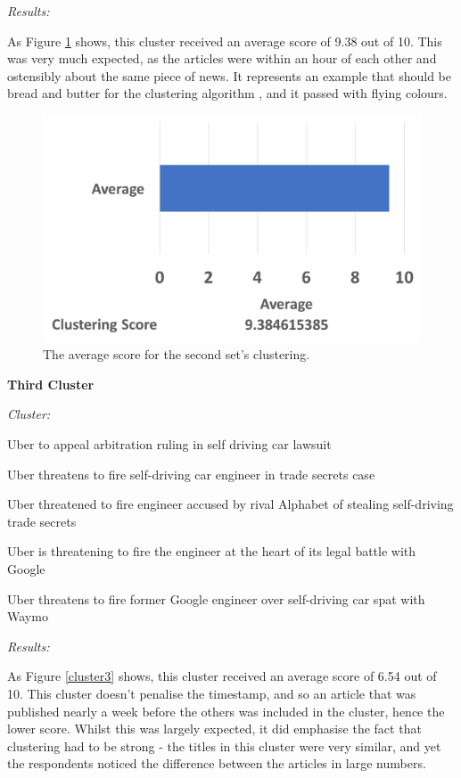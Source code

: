 \documentclass[12pt]{article}
\begin{document}
\emph{Results:}

As Figure \ref{cluster2} shows, this cluster received an average score of 9.38 out of 10. This was very much expected, as the articles were within an hour of each other and ostensibly about the same piece of news. It represents an example that should be bread and butter for the clustering algorithm , and it passed with flying colours. \\

\begin{figure}[ht!]
  \centering
    \includegraphics[scale=0.6]{cluster2score.png}
   \caption[The average score for a cluster]{The average score for the second set's clustering.} 
   \label{cluster2}
\end{figure} 

\textbf{Third Cluster}

\begin{mdframed}

\emph{Cluster:}

Uber to appeal arbitration ruling in self driving car lawsuit

Uber threatens to fire self-driving car engineer in trade secrets case

Uber threatened to fire engineer accused by rival Alphabet of stealing self-driving trade secrets

Uber is threatening to fire the engineer at the heart of its legal battle with Google

Uber threatens to fire former Google engineer over self-driving car spat with Waymo \\

\end{mdframed}

\emph{Results:}

As Figure \ref{cluster3} shows, this cluster received an average score of 6.54 out of 10. This cluster doesn't penalise the timestamp, and so an article that was published nearly a week before the others was included in the cluster, hence the lower score. Whilst this was largely expected, it did emphasise the fact that clustering had to be strong - the titles in this cluster were very similar, and yet the respondents noticed the difference between the articles in large numbers. \\
\end{document}

